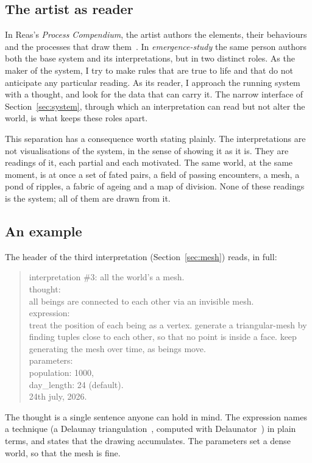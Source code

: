 \subsection{The artist as reader}

In Reas's \emph{Process Compendium}, the artist authors the elements, their behaviours and the processes that draw them~\cite{reas2010}. In \emph{emergence-study} the same person authors both the base system and its interpretations, but in two distinct roles. As the maker of the system, I try to make rules that are true to life and that do not anticipate any particular reading. As its reader, I approach the running system with a thought, and look for the data that can carry it. The narrow interface of Section~\ref{sec:system}, through which an interpretation can read but not alter the world, is what keeps these roles apart.

This separation has a consequence worth stating plainly. The interpretations are not visualisations of the system, in the sense of showing it as it is. They are readings of it, each partial and each motivated. The same world, at the same moment, is at once a set of fated pairs, a field of passing encounters, a mesh, a pond of ripples, a fabric of ageing and a map of division. None of these readings is the system; all of them are drawn from it.

\subsection{An example}

The header of the third interpretation (Section~\ref{sec:mesh}) reads, in full:

\begin{quote}\small\ttfamily
interpretation \#3: all the world's a mesh.\\[0.4em]
thought:\\
all beings are connected to each other via an invisible mesh.\\[0.4em]
expression:\\
treat the position of each being as a vertex. generate a triangular-mesh by finding tuples close to each other, so that no point is inside a face. keep generating the mesh over time, as beings move.\\[0.4em]
parameters:\\
population: 1000,\\
day\_length: 24 (default).\\[0.4em]
24th july, 2026.
\end{quote}

The thought is a single sentence anyone can hold in mind. The expression names a technique (a Delaunay triangulation~\cite{delaunay1934}, computed with Delaunator~\cite{delaunator}) in plain terms, and states that the drawing accumulates. The parameters set a dense world, so that the mesh is fine.
